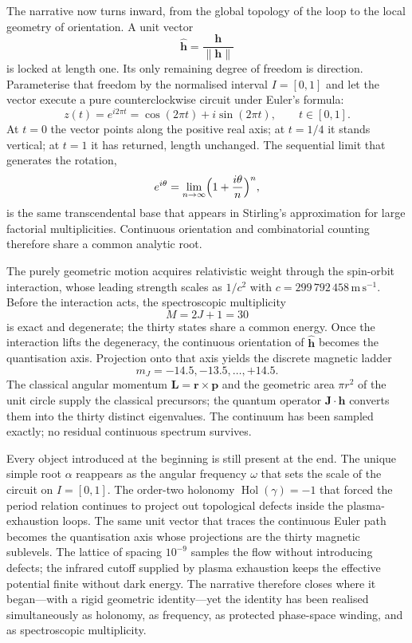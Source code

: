 The narrative now turns inward, from the global topology of the loop to the local geometry of orientation. A unit vector
\[
\hat{\mathbf{h}}=\frac{\mathbf{h}}{\|\mathbf{h}\|}
\]
is locked at length one. Its only remaining degree of freedom is direction. Parameterise that freedom by the normalised interval \(I=[0,1]\) and let the vector execute a pure counterclockwise circuit under Euler’s formula:
\[
z(t)=e^{i2\pi t}=\cos(2\pi t)+i\sin(2\pi t),\qquad t\in[0,1].
\]
At \(t=0\) the vector points along the positive real axis; at \(t=1/4\) it stands vertical; at \(t=1\) it has returned, length unchanged. The sequential limit that generates the rotation,
\[
e^{i\theta}=\lim_{n\to\infty}\Bigl(1+\frac{i\theta}{n}\Bigr)^n,
\]
is the same transcendental base that appears in Stirling’s approximation for large factorial multiplicities. Continuous orientation and combinatorial counting therefore share a common analytic root.

The purely geometric motion acquires relativistic weight through the spin-orbit interaction, whose leading strength scales as \(1/c^2\) with \(c=299\,792\,458\,\mathrm{m\,s^{-1}}\). Before the interaction acts, the spectroscopic multiplicity
\[
M=2J+1=30
\]
is exact and degenerate; the thirty states share a common energy. Once the interaction lifts the degeneracy, the continuous orientation of \(\hat{\mathbf{h}}\) becomes the quantisation axis. Projection onto that axis yields the discrete magnetic ladder
\[
m_J=-14.5,-13.5,\dots,+14.5.
\]
The classical angular momentum \(\mathbf{L}=\mathbf{r}\times\mathbf{p}\) and the geometric area \(\pi r^2\) of the unit circle supply the classical precursors; the quantum operator \(\mathbf{J}\cdot\hat{\mathbf{h}}\) converts them into the thirty distinct eigenvalues. The continuum has been sampled exactly; no residual continuous spectrum survives.

Every object introduced at the beginning is still present at the end. The unique simple root \(\alpha\) reappears as the angular frequency \(\omega\) that sets the scale of the circuit on \(I=[0,1]\). The order-two holonomy \(\operatorname{Hol}(\gamma)=-1\) that forced the period relation continues to project out topological defects inside the plasma-exhaustion loops. The same unit vector that traces the continuous Euler path becomes the quantisation axis whose projections are the thirty magnetic sublevels. The lattice of spacing \(10^{-9}\) samples the flow without introducing defects; the infrared cutoff supplied by plasma exhaustion keeps the effective potential finite without dark energy. The narrative therefore closes where it began—with a rigid geometric identity—yet the identity has been realised simultaneously as holonomy, as frequency, as protected phase-space winding, and as spectroscopic multiplicity.

